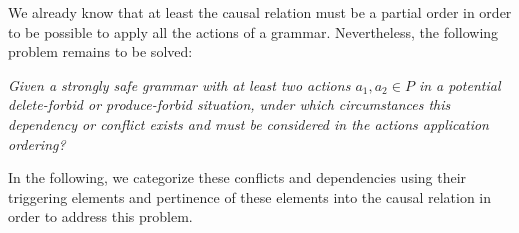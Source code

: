 We already know that at least the causal relation must be a partial order in order to be possible to apply all the actions of a grammar. Nevertheless, the following problem remains to be solved:

\begin{intuition}
  \emph{Given a strongly safe grammar \doublyTypedGraphGrammarCore{} with at least two actions $a_1, a_2 \in P$ in a potential delete-forbid or produce-forbid situation, under which circumstances this dependency or conflict exists and must be considered in the actions application ordering?}
\end{intuition}

In the following, we categorize these conflicts and dependencies using their triggering elements and pertinence of these elements into the causal relation in order to address this problem.


